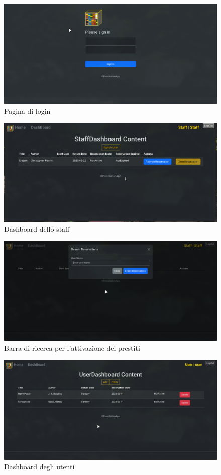 \documentclass[twoside,openright,titlepage,fleqn,headinclude,12pt,a4paper,BCOR=5mm,footinclude]{scrbook}
\begin{document}
\begin{figure}[H]
  \centering
  \includegraphics[width=0.9\linewidth]{images/Login.png}
  \caption{Pagina di login}
  \label{fig:Pagina di login}
\end{figure}
\begin{figure}[H]
  \centering
  \includegraphics[width=0.9\linewidth]{images/StaffDashboard.png}
  \caption{Dashboard dello staff}
  \label{fig:Dashboard dello staff}
\end{figure}
\begin{figure}[H]
  \centering
  \includegraphics[width=0.9\linewidth]{images/SearchReservations.png}
  \caption{Barra di ricerca per l'attivazione dei prestiti}
  \label{fig:Barra di ricerca per l'attivazione dei prestiti}
\end{figure}
\begin{figure}[H]
  \centering
  \includegraphics[width=0.9\linewidth]{images/UserDashboard.png}
  \caption{Dashboard degli utenti}
  \label{fig:Dashboard degli utenti }
\end{figure}
\end{document}
